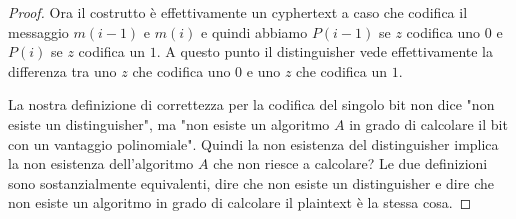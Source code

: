 \begin{proof}
Ora il costrutto è effettivamente un cyphertext a caso che codifica il messaggio $m(i-1)$ e $m(i)$ e quindi abbiamo $P(i-1)$ se $z$ codifica uno $0$ e $P(i)$ se $z$ codifica un $1$. A questo punto il distinguisher vede effettivamente la differenza tra uno $z$ che codifica uno $0$ e uno $z$ che codifica un $1$.

La nostra definizione di correttezza per la codifica del singolo bit non dice "non esiste un distinguisher", ma "non esiste un algoritmo $A$ in grado di calcolare il bit con un vantaggio polinomiale". Quindi la non esistenza del distinguisher implica la non esistenza dell'algoritmo $A$ che non riesce a calcolare? Le due definizioni sono sostanzialmente equivalenti, dire che non esiste un distinguisher e dire che non esiste un algoritmo in grado di calcolare il plaintext è la stessa cosa. 


\end{proof}
